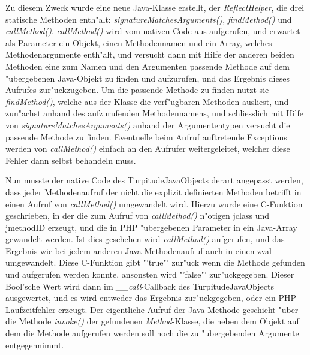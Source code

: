 Zu diesem Zweck wurde eine neue Java-Klasse erstellt, der \emph{ReflectHelper}, die drei statische Methoden enth"alt:
\emph{signatureMatchesArguments()}, \emph{findMethod()} und \emph{callMethod()}. 
\emph{callMethod()} wird vom nativen Code aus aufgerufen, und erwartet als Parameter ein Objekt, einen Methodennamen und ein 
Array, welches Methodenargumente enth"alt, und versucht dann mit Hilfe der anderen beiden Methoden eine zum Namen und den Argumenten 
passende Methode auf dem "ubergebenen Java-Objekt zu finden und aufzurufen, und das Ergebnis dieses Aufrufes zur"uckzugeben.
Um die passende Methode zu finden nutzt sie \emph{findMethod()}, welche aus der Klasse die verf"ugbaren Methoden ausliest, und 
zun"achst anhand des aufzurufenden Methodennamens, und schliesslich mit Hilfe von \emph{signatureMatchesArguments()} anhand der
Argumententypen versucht die passende Methode zu finden. Eventuelle beim Aufruf auftretende Exceptions werden von \emph{callMethod()}
einfach an den Aufrufer weitergeleitet, welcher diese Fehler dann selbst behandeln muss.

Nun musste der native Code des TurpitudeJavaObjects derart angepasst werden, dass jeder Methodenaufruf der nicht die explizit
definierten Methoden betrifft in einen Aufruf von \emph{callMethod()} umgewandelt wird. Hierzu wurde eine C-Funktion geschrieben,
in der die zum Aufruf von \emph{callMethod()} n"otigen jclass und jmethodID erzeugt, und die in PHP "ubergebenen Parameter
in ein Java-Array gewandelt werden. Ist dies geschehen wird \emph{callMethod()} aufgerufen, und das Ergebnis wie bei jedem
anderen Java-Methodenaufruf auch in einen zval umgewandelt. Diese C-Funktion gibt "'true"' zur"uck wenn die Methode gefunden
und aufgerufen werden konnte, ansonsten wird "'false"' zur"uckgegeben. Dieser Bool'sche Wert wird dann im \emph{\_\_call}-Callback
des TurpitudeJavaObjects ausgewertet, und es wird entweder das Ergebnis zur"uckgegeben, oder ein PHP-Laufzeitfehler erzeugt.
Der eigentliche Aufruf der Java-Methode geschieht "uber die Methode \emph{invoke()} der gefundenen \emph{Method}-Klasse, die neben
dem Objekt auf dem die Methode aufgerufen werden soll noch die zu "ubergebenden Argumente entgegennimmt.

